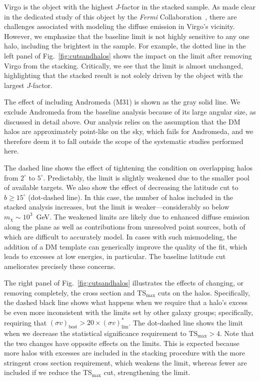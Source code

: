 Virgo is the object with the highest $J$-factor in the stacked sample. As made clear in the dedicated study of this object by the \emph{Fermi} Collaboration~\cite{Ackermann:2015fdi}, there are challenges associated with modeling the diffuse emission in Virgo's vicinity.  However, we emphasize that the baseline limit is not highly sensitive to any one halo, including the brightest in the sample.  For example, the dotted line in the left panel of Fig.~\ref{fig:cutsandhalos} shows the impact on the limit after removing Virgo from the stacking. Critically, we see that the limit is almost unchanged, highlighting that the stacked result is not solely driven by the object with the largest $J$-factor.

The effect of including Andromeda (M31) is shown as the gray solid line. We exclude Andromeda from the baseline analysis because of its large angular size, as discussed in detail above. Our analysis relies on the assumption that the DM halos are approximately point-like on the sky, which fails for Andromeda, and we therefore deem it to fall outside the scope of the systematic studies performed here.

The dashed line shows the effect of tightening the condition on overlapping halos from $2^\circ$ to $5^\circ$. Predictably, the limit is slightly weakened due to the smaller pool of available targets.  We also show the effect of decreasing the latitude cut to $b\geq 15^\circ$ (dot-dashed line). In this case, the number of halos included in the stacked analysis increases, but the limit is weaker---considerably so below $m_\chi \sim 10^3$~GeV.  The weakened limits are likely due to enhanced diffuse emission along the plane as well as contributions from unresolved point sources, both of which are difficult to accurately model. In cases with such mismodeling, the addition of a DM template can generically improve the quality of the fit, which leads to excesses at low energies, in particular.  The baseline latitude cut ameliorates  precisely these concerns.

The right  panel of Fig.~\ref{fig:cutsandhalos} illustrates the effects of changing, or removing completely, the cross section and TS$_\text{max}$ cuts on the halos.  Specifically, the dashed black line shows what happens when we require that a halo's excess be even more inconsistent with the limits set by other galaxy groups; specifically, requiring that $(\sigma v)_\text{best} > 20 \times (\sigma v)^*_\text{lim}$. The dot-dashed line shows the limit when we decrease the statistical significance requirement to $\text{TS}_\text{max} > 4$.  
Note that the two changes have opposite effects on the limits.  This is expected because more halos with excesses are included in the stacking procedure with the more stringent cross section requirement, which weakens the limit, whereas fewer are included if we reduce the TS$_\text{max}$ cut, strengthening the limit.  

